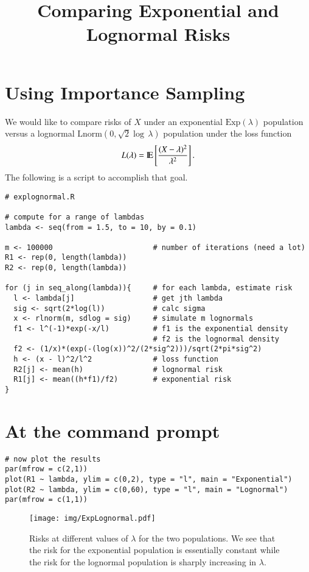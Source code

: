 \documentclass[11pt,english]{article}
\title{Comparing Exponential and Lognormal Risks}
\date{}
\begin{document}
\maketitle


\section*{Using Importance Sampling}
\label{sec-1}


We would like to compare risks of $X$ under an exponential $\mathrm{Exp}(\lambda)$ population versus a lognormal $\mathrm{Lnorm}(0,\sqrt{2}\log\,\lambda)$ population under the loss function
\[
L(\lambda) = \mathrm{I\hspace{-1.5pt}E} \left[\frac{(X - \lambda)^{2}}{\lambda^{2}}\right].
\]
The following is a script to accomplish that goal.
\begin{verbatim}
# explognormal.R

# compute for a range of lambdas
lambda <- seq(from = 1.5, to = 10, by = 0.1)

m <- 100000                       # number of iterations (need a lot)
R1 <- rep(0, length(lambda))
R2 <- rep(0, length(lambda))

for (j in seq_along(lambda)){     # for each lambda, estimate risk
  l <- lambda[j]                  # get jth lambda
  sig <- sqrt(2*log(l))           # calc sigma
  x <- rlnorm(m, sdlog = sig)     # simulate m lognormals
  f1 <- l^(-1)*exp(-x/l)          # f1 is the exponential density
                                  # f2 is the lognormal density
  f2 <- (1/x)*(exp(-(log(x))^2/(2*sig^2)))/sqrt(2*pi*sig^2) 
  h <- (x - l)^2/l^2              # loss function
  R2[j] <- mean(h)                # lognormal risk
  R1[j] <- mean((h*f1)/f2)        # exponential risk
}
\end{verbatim}
\section*{At the command prompt}
\label{sec-2}


\begin{verbatim}
# now plot the results
par(mfrow = c(2,1))
plot(R1 ~ lambda, ylim = c(0,2), type = "l", main = "Exponential")
plot(R2 ~ lambda, ylim = c(0,60), type = "l", main = "Lognormal")
par(mfrow = c(1,1))
\end{verbatim}

\begin{figure}[h!]
\centering
\texttt{[image: img/ExpLognormal.pdf]}
\caption{\label{fig:yplot}Risks at different values of $\lambda$ for the two populations.  We see that the risk for the exponential population is essentially constant while the risk for the lognormal population is sharply increasing in $\lambda$.}
\end{figure}
\end{document}
